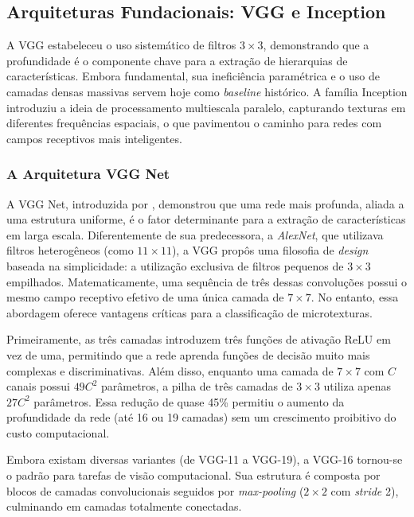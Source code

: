 \subsection{Arquiteturas Fundacionais: VGG e Inception}

    A VGG estabeleceu o uso sistemático de filtros $3 \times 3$, demonstrando que a profundidade é o componente chave para a extração de hierarquias de características. Embora fundamental, sua ineficiência paramétrica e o uso de camadas densas massivas servem hoje como \textit{baseline} histórico. A família Inception introduziu a ideia de processamento multiescala paralelo, capturando texturas em diferentes frequências espaciais, o que pavimentou o caminho para redes com campos receptivos mais inteligentes.

    \subsubsection{A Arquitetura VGG Net}

        A VGG Net, introduzida por , demonstrou que uma rede mais profunda, aliada a uma estrutura uniforme, é o fator determinante para a extração de características em larga escala. Diferentemente de sua predecessora, a \textit{AlexNet}, que utilizava filtros heterogêneos (como $11 \times 11$), a VGG propôs uma filosofia de \textit{design} baseada na simplicidade: a utilização exclusiva de filtros pequenos de $3 \times 3$ empilhados. Matematicamente, uma sequência de três dessas convoluções possui o mesmo campo receptivo efetivo de uma única camada de $7 \times 7$. No entanto, essa abordagem oferece vantagens críticas para a classificação de microtexturas.

        Primeiramente, as três camadas introduzem três funções de ativação ReLU em vez de uma, permitindo que a rede aprenda funções de decisão muito mais complexas e discriminativas. Além disso, enquanto uma camada de $7 \times 7$ com $C$ canais possui $49C^2$ parâmetros, a pilha de três camadas de $3 \times 3$ utiliza apenas $27C^2$ parâmetros. Essa redução de quase 45\% permitiu o aumento da profundidade da rede (até 16 ou 19 camadas) sem um crescimento proibitivo do custo computacional.
        
        Embora existam diversas variantes (de VGG-11 a VGG-19), a VGG-16 tornou-se o padrão para tarefas de visão computacional. Sua estrutura é composta por blocos de camadas convolucionais seguidos por \textit{max-pooling} ($2 \times 2$ com \textit{stride} 2), culminando em camadas totalmente conectadas.

